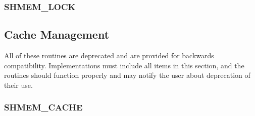 \documentclass[10pt]{book}
\begin{document}
\subsubsection{\textbf{SHMEM\_LOCK}}\label{subsec:shmem_lock}






\subsection{Cache Management}
All of these routines are deprecated and are provided for backwards
compatibility.  Implementations must include all items in this section, and the
routines should function properly and may notify the user about deprecation of
their use.

\subsubsection{\textbf{SHMEM\_CACHE}}\label{subsec:shmem_cache}


\clearpage


\clearpage
{}
{}
\printindex
\end{document}
